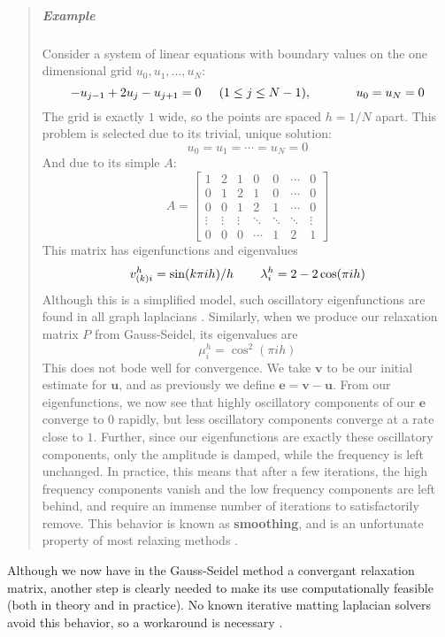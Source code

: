 \begin{quote}
\item
\subparagraph{Example}
Consider a system of linear equations with boundary values on the one dimensional grid $u_0,u_1,\ldots,u_N$:
\[-u_{j-1}+2u_j-u_{j+1}=0\hspace{.2in}(1\leq j\leq N-1),
\hspace{.5in}u_0=u_N=0\]
The grid is exactly $1$ wide, so the points are spaced $h=1/N$ apart.
This problem is selected due to its trivial, unique solution:
\[u_0=u_1=\cdots=u_N=0\]
And due to its simple $A$:
\[A=
\left[\begin{array}{ccccccc}
1 & 2 & 1 & 0 & 0 & \cdots & 0 \\
0 & 1 & 2 & 1 & 0 & \cdots & 0 \\
0 & 0 & 1 & 2 & 1 & \cdots & 0 \\
\vdots & \vdots & \vdots & \ddots & \ddots & \ddots & \vdots \\
0 & 0 & 0 & \cdots & 1 & 2 & 1
\end{array}\right]\]
This matrix has eigenfunctions and eigenvalues
\[v^h_{(k)i}=\sin(k\pi ih)/h\hspace{.3in}
\lambda_i^h=2-2\cos(\pi ih)\]
Although this is a simplified model, such oscillatory eigenfunctions are found in all graph laplacians \cite{lee14}. Similarly, when we produce our relaxation matrix $P$ from Gauss-Seidel, its eigenvalues are
\[\mu_i^h=\cos^2(\pi i h)\]
This does not bode well for convergence. We take $\textbf{v}$ to be our initial estimate for $\textbf{u}$, and as previously we define $\textbf{e}=\textbf{v}-\textbf{u}$. From our eigenfunctions, we now see that highly oscillatory components of our $\textbf{e}$ converge to $0$ rapidly, but less oscillatory components converge at a rate close to $1$. Further, since our eigenfunctions are exactly these oscillatory components, only the amplitude is damped, while the frequency is left unchanged. In practice, this means that after a few iterations, the high frequency components vanish and the low frequency components are left behind, and require an immense number of iterations to satisfactorily remove. This behavior is known as \textbf{smoothing}, and is an unfortunate property of most relaxing methods \cite{briggs87}.
\end{quote}
Although we now have in the Gauss-Seidel method a convergant relaxation matrix, another step is clearly needed to make its use computationally feasible (both in theory and in practice). No known iterative matting laplacian solvers avoid this behavior, so a workaround is necessary \cite{lee14}.